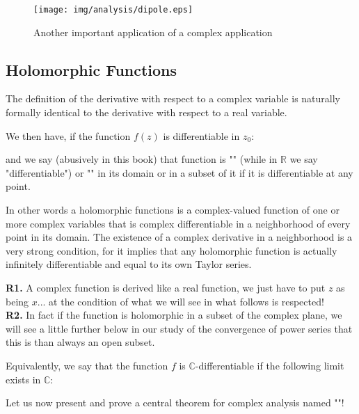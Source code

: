 	\pagebreak
	\begin{tcolorbox}[colframe=black,colback=white,sharp corners]
	\begin{figure}[H]
		\begin{center}
			\texttt{[image: img/analysis/dipole.eps]}
		\end{center}	
		\caption{Another important application of a complex application}
	\end{figure}
	\end{tcolorbox}
	
	\subsection{Holomorphic Functions}
	The definition of the derivative with respect to a complex variable is naturally formally identical to the derivative with respect to a real variable.
	
	We then have, if the function $f(z)$ is differentiable in $z_0$:
	
	
	and we say (abusively in this book) that function is "" (while in $\mathbb{R}$ we say "differentiable") or "" in its domain or in a subset of it if it is differentiable at any point.
	
	In other words a holomorphic functions is a complex-valued function of one or more complex variables that is complex differentiable in a neighborhood of every point in its domain. The existence of a complex derivative in a neighborhood is a very strong condition, for it implies that any holomorphic function is actually infinitely differentiable and equal to its own Taylor series.
	
	\begin{tcolorbox}[title=Remarks,colframe=black,arc=10pt]
	\textbf{R1.} A complex function is derived like a real function, we just have to put $z$ as being $x$... at the condition of what we will see in what follows is respected!\\
	
	\textbf{R2.} In fact if the function is holomorphic in a subset of the complex plane, we will see a little further below in our study of the convergence of power series that this is than always an open subset.
	\end{tcolorbox}
	Equivalently, we say that the function $f$ is $\mathbb{C}$-differentiable if the following limit exists in  $\mathbb{C}$:
	
	Let us now present and prove a central theorem for complex analysis named ""!
	
